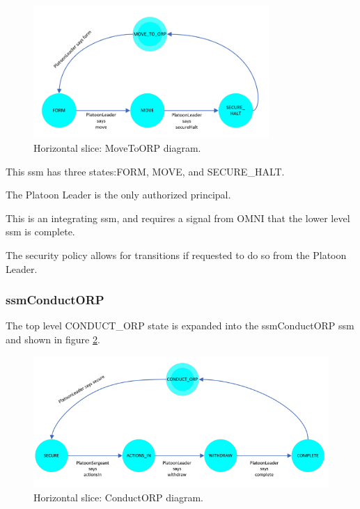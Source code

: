 \documentclass[../../main/main.tex]{subfiles}
\begin{document}
\begin{figure}[!h]
\centering
\includegraphics[width=0.8\textwidth]{../figures/ssmMoveToORPDiagram}
\caption{\label{ssmMoveToORPDiagram} Horizontal slice: MoveToORP diagram.}
\end{figure}

This \gls{ssm} has three states:FORM, MOVE, and SECURE_HALT.  

The Platoon Leader is the only authorized principal.  

This is an integrating \gls{ssm}, and requires a signal from OMNI that the lower level \gls{ssm} is complete.

The security policy allows for transitions if requested to do so from the Platoon Leader.  

\clearpage

\subsubsection{ssmConductORP}\label{sssec:ssmConductORP}
The top level CONDUCT_ORP state is expanded into the ssmConductORP \gls{ssm} and shown in figure \ref{ssmConductORPDiagram}.


\begin{figure}[h!]
\centering
\includegraphics[width=\textwidth]{../figures/ssmConductORPDiagram}
\caption{\label{ssmConductORPDiagram} Horizontal slice: ConductORP diagram.}
\end{figure}
\end{document}
